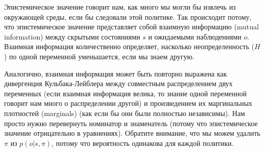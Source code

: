 \documentclass[twoside,leqno, 11pt]{article}
\begin{document}
	
	Эпистемическое значение говорит нам, как много мы могли бы извлечь из окружающей среды, если бы следовали этой политике. Так происходит потому, что эпистемическое значение представляет собой взаимную информацию (mutual information) между скрытыми состояниями $s$ и ожидаемыми наблюдениями $o$. Взаимная информация количественно определяет, насколько неопределенность ($H$) по одной переменной уменьшается, если мы знаем другую.
	
	
	\begin{figure}[h]
	\end{figure}
	
	Аналогично, взаимная информация может быть повторно выражена как дивергенция Кульбака-Лейблера между совместным распределением двух переменных (если взаимная информация велика, то знание одной переменной говорит нам много о распределении другой) и произведением их маргинальных плотностей (marginals) (как если бы они были полностью независимы). Нам просто нужно перевернуть номинатор и знаменатель (потому что эпистемическое значение отрицательно в уравнениях). Обратите внимание, что мы можем удалить $\pi$ из $p(o|s,\pi)$, потому что вероятность одинакова для каждой политики.
	
	
\end{document}
